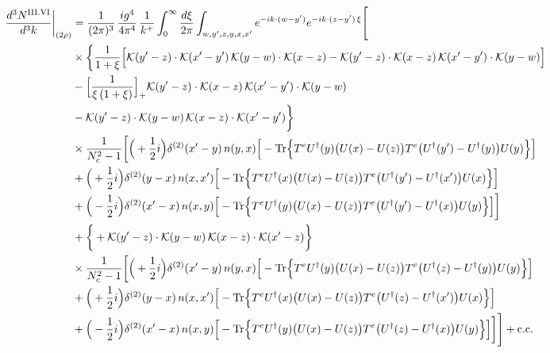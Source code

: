 \documentclass[9pt]{article}
\numberwithin{equation}{section}
\begin{document}
\begin{align}
\frac{d^{3}N^{\rm III.VI}}{d^{3}k}\bigg|_{(2\rho)}&=\frac{1}{(2\pi)^{3}}\,\frac{ig^{4}}{4\pi^{4}}\,\frac{1}{k^{+}}\int_{0}^{\infty}\frac{d\xi}{2\pi}\int_{w,y',z,y,x,x'}e^{-ik\cdot(w-y')}e^{-ik\cdot(z-y')\,\xi}\Bigg[\notag\\
&\times\bigg\{\frac{1}{1+\xi}\Big[\mathcal{K}(y'-z)\cdot\mathcal{K}(x'-y')\,\mathcal{K}(y-w)\cdot\mathcal{K}(x-z)-\mathcal{K}(y'-z)\cdot\mathcal{K}(x-z)\,\mathcal{K}(x'-y')\cdot\mathcal{K}(y-w)\Big]\notag\\
&-\Big[\frac{1}{\xi\,(1+\xi)}\Big]_{+}\mathcal{K}(y'-z)\cdot\mathcal{K}(x-z)\,\mathcal{K}(x'-y')\cdot\mathcal{K}(y-w)\notag\\
&-\mathcal{K}(y'-z)\cdot\mathcal{K}(y-w)\,\mathcal{K}(x-z)\cdot\mathcal{K}(x'-y')\bigg\}\notag\\
&\times \frac{1}{N_{c}^{2}-1}\bigg[\Big(+\frac{1}{2}i\Big)\delta^{(2)}(x'-y)\,n(y,x)\Big[-{\rm Tr}\Big\{T^{e}U^{\dagger}(y)\big(U(x)-U(z)\big)T^{e}\big(U^{\dagger}(y')-U^{\dagger}(y)\big)U(y)\Big\}\Big]\notag\\
& +\Big(+\frac{1}{2}i\Big)\delta^{(2)}(y-x)\,n(x,x')\Big[-{\rm Tr}\Big\{T^{e}U^{\dagger}(x)\big(U(x)-U(z)\big)T^{e}\big(U^{\dagger}(y')-U^{\dagger}(x')\big)U(x)\Big\}\Big]\notag\\
& +\Big(-\frac{1}{2}i\Big)\delta^{(2)}(x'-x)\,n(x,y)\Big[-{\rm Tr}\Big\{T^{e}U^{\dagger}(y)\big(U(x)-U(z)\big)T^{e}\big(U^{\dagger}(y')-U^{\dagger}(x)\big)U(y)\Big\}\Big]\bigg]\notag\\
&+\bigg\{+\mathcal{K}(y'-z)\cdot\mathcal{K}(y-w)\,\mathcal{K}(x-z)\cdot\mathcal{K}(x'-z)\bigg\}\notag\\
&\times \frac{1}{N_{c}^{2}-1}\bigg[\Big(+\frac{1}{2}i\Big)\delta^{(2)}(x'-y)\,n(y,x)\Big[-{\rm Tr}\Big\{T^{e}U^{\dagger}(y)\big(U(x)-U(z)\big)T^{e}\big(U^{\dagger}(z)-U^{\dagger}(y)\big)U(y)\Big\}\Big]\notag\\
& +\Big(+\frac{1}{2}i\Big)\delta^{(2)}(y-x)\,n(x,x')\Big[-{\rm Tr}\Big\{T^{e}U^{\dagger}(x)\big(U(x)-U(z)\big)T^{e}\big(U^{\dagger}(z)-U^{\dagger}(x')\big)U(x)\Big\}\Big]\notag\\
& +\Big(-\frac{1}{2}i\Big)\delta^{(2)}(x'-x)\,n(x,y)\Big[-{\rm Tr}\Big\{T^{e}U^{\dagger}(y)\big(U(x)-U(z)\big)T^{e}\big(U^{\dagger}(z)-U^{\dagger}(x)\big)U(y)\Big\}\Big]\bigg]\Bigg]+{\rm c.c.}\label{eq:S-III.VI-2}
\end{align}
\end{document}
